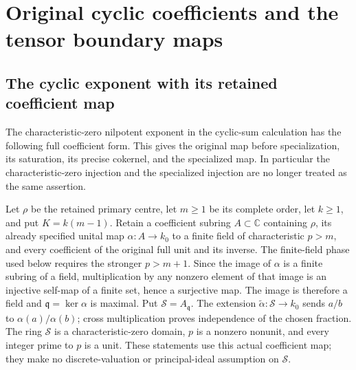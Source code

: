 \begingroup
\section{Original cyclic coefficients and the tensor boundary maps}

\subsection{The cyclic exponent with its retained coefficient map}
\label{sec:btp-cyclic-update}

The characteristic-zero nilpotent exponent in the cyclic-sum calculation
has the following full coefficient form.  This gives the original map
before specialization, its saturation, its precise cokernel, and the
specialized map.  In particular the characteristic-zero injection and
the specialized injection are no longer treated as the same assertion.

Let \(\rho\) be the retained primary centre, let \(m\geq1\) be its
complete order, let \(k\geq1\), and put \(K=k(m-1)\).  Retain a
coefficient subring \(A\subset\mathbb C\) containing \(\rho\), its already specified
unital map \(\alpha:A\to k_0\) to a finite field of characteristic
\(p>m\), and every coefficient of the original full unit and its
inverse.  The finite-field phase used below requires the stronger
\(p>m+1\).  Since the image of \(\alpha\) is a finite subring of a
field, multiplication by any nonzero element of that image is an
injective self-map of a finite set, hence a surjective map.  The image
is therefore a field and \(\mathfrak q=\ker\alpha\) is maximal.
Put \(\mathscr S=A_{\mathfrak q}\).  The extension
\(\widetilde\alpha:\mathscr S\to k_0\) sends \(a/b\) to
\(\alpha(a)/\alpha(b)\); cross multiplication proves independence
of the chosen fraction.  The ring \(\mathscr S\) is a characteristic-zero
domain, \(p\) is a nonzero nonunit, and every integer prime to \(p\)
is a unit.  These statements use this actual coefficient map; they
make no discrete-valuation or principal-ideal assumption on \(\mathscr S\).

